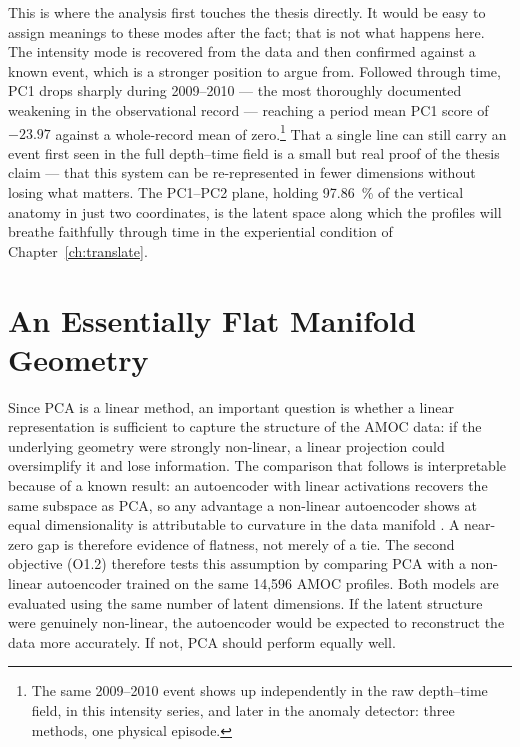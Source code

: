 This is where the analysis first touches the thesis directly. It would be easy to assign meanings to these modes after the fact; that is not what happens here. The intensity mode is recovered from the data and then confirmed against a known event, which is a stronger position to argue from. Followed through time, PC1 drops sharply during 2009--2010 --- the most thoroughly documented weakening in the observational record --- reaching a period mean PC1 score of $-23.97$ against a whole-record mean of zero.\footnote{The same 2009--2010 event shows up independently in the raw depth--time field, in this intensity series, and later in the anomaly detector: three methods, one physical episode.} That a single line can still carry an event first seen in the full depth--time field is a small but real proof of the thesis claim --- that this system can be re-represented in fewer dimensions without losing what matters. The PC1--PC2 plane, holding \SI{97.86}{\percent} of the vertical anatomy in just two coordinates, is the latent space along which the profiles will breathe faithfully through time in the experiential condition of Chapter~\ref{ch:translate}.

\section{An Essentially Flat Manifold Geometry}
\label{sec:detect-ae}
 
Since PCA is a linear method, an important question is whether a linear representation is sufficient to capture the structure of the AMOC data: if the underlying geometry were strongly non-linear, a linear projection could oversimplify it and lose information. The comparison that follows is interpretable because of a known result: an autoencoder with linear activations recovers the same subspace as PCA, so any advantage a non-linear autoencoder shows at equal dimensionality is attributable to curvature in the data manifold \citep{baldi1989}. A near-zero gap is therefore evidence of flatness, not merely of a tie. The second objective (O1.2) therefore tests this assumption by comparing PCA with a non-linear autoencoder trained on the same 14{,}596 AMOC profiles. Both models are evaluated using the same number of latent dimensions. If the latent structure were genuinely non-linear, the autoencoder would be expected to reconstruct the data more accurately. If not, PCA should perform equally well.
 

